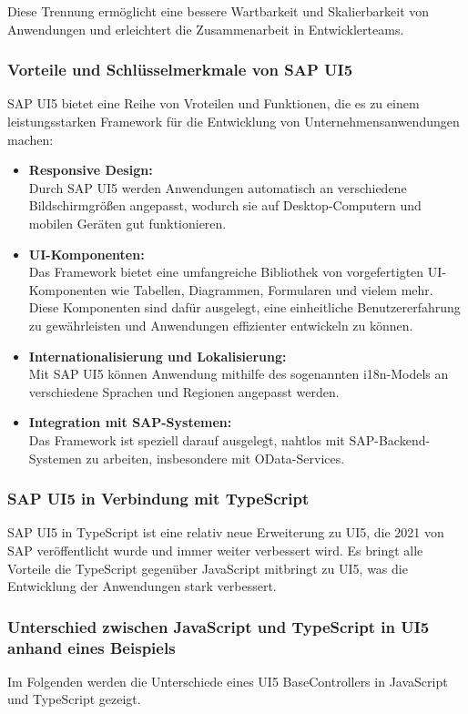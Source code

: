 Diese Trennung ermöglicht eine bessere Wartbarkeit und Skalierbarkeit von Anwendungen und erleichtert die Zusammenarbeit in Entwicklerteams.

\subsubsection[Vorteile und Schlüsselmerkmale von SAP UI5]{Vorteile und Schlüsselmerkmale von SAP UI5}
SAP UI5 bietet eine Reihe von Vroteilen und Funktionen, die es zu einem leistungsstarken Framework für die Entwicklung von Unternehmensanwendungen machen:

\begin{itemize}
    \item \textbf{Responsive Design:} \\
    Durch SAP UI5 werden Anwendungen automatisch an verschiedene Bildschirmgrößen angepasst, wodurch sie auf Desktop-Computern und mobilen Geräten gut funktionieren.
    \item \textbf{UI-Komponenten:} \\
    Das Framework bietet eine umfangreiche Bibliothek von vorgefertigten UI-Komponenten wie Tabellen, Diagrammen, Formularen und vielem mehr.
    Diese Komponenten sind dafür ausgelegt, eine einheitliche Benutzererfahrung zu gewährleisten und Anwendungen effizienter entwickeln zu können.
    \item \textbf{Internationalisierung und Lokalisierung:} \\
    Mit SAP UI5 können Anwendung mithilfe des sogenannten i18n-Models an verschiedene Sprachen und Regionen angepasst werden. 
    \item \textbf{Integration mit SAP-Systemen:} \\
    Das Framework ist speziell darauf ausgelegt, nahtlos mit SAP-Backend-Systemen zu arbeiten, insbesondere mit OData-Services.
\end{itemize}

\subsubsection[SAP UI5 in Verbindung mit TypeScript]{SAP UI5 in Verbindung mit TypeScript}
SAP UI5 in TypeScript ist eine relativ neue Erweiterung zu UI5, die 2021 von SAP veröffentlicht wurde und immer weiter verbessert wird.
Es bringt alle Vorteile die TypeScript gegenüber JavaScript mitbringt zu UI5, was die Entwicklung der Anwendungen stark verbessert.

\subsubsection[Unterschied zwischen JavaScript und TypeScript in UI5 anhand eines Beispiels]{Unterschied zwischen JavaScript und TypeScript in UI5 anhand eines Beispiels}
Im Folgenden werden die Unterschiede eines UI5 BaseControllers in JavaScript und TypeScript gezeigt. 

